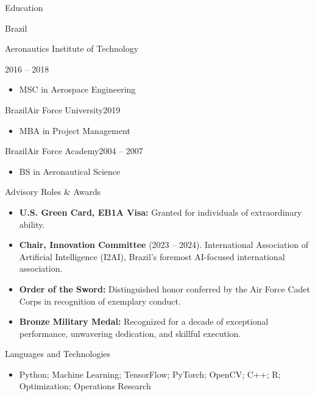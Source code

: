\documentclass[]{mcdowellcv}
\begin{document}
	\begin{cvsection}{Education}
		\begin{cvsubsection}{Brazil}{\protect\parbox{2.6in}{Aeronautics Institute of Technology}}{2016 -- 2018}
			\begin{itemize}
				\item MSC in Aerospace Engineering
			\end{itemize}
		\end{cvsubsection}
		
		\begin{cvsubsection}{Brazil}{Air Force University}{2019}
			\begin{itemize}
				\item MBA in Project Management
			\end{itemize}
		\end{cvsubsection}
		
		\begin{cvsubsection}{Brazil}{Air Force Academy}{2004 -- 2007}
			\begin{itemize}
				\item BS in Aeronautical Science
			\end{itemize}
		\end{cvsubsection}
	\end{cvsection}
	

		
	
	\begin{cvsection}{Advisory Roles \& Awards}
		\begin{cvsubsection}{}{}{}	
			\begin{itemize}
				\item \textbf{U.S. Green Card, EB1A Visa:} Granted for individuals of extraordinary ability.
				\item \textbf{Chair, Innovation Committee} (2023 -- 2024). International Association of Artificial Intelligence (I2AI), Brazil's foremost AI-focused international association.
				\item \textbf{Order of the Sword:} Distinguished honor conferred by the Air Force Cadet Corps in recognition of exemplary conduct.
				\item \textbf{Bronze Military Medal:} Recognized for a decade of exceptional performance, unwavering dedication, and skillful execution.
			\end{itemize}
		\end{cvsubsection}
	\end{cvsection}
	
	\begin{cvsection}{Languages and Technologies}
		\begin{cvsubsection}{}{}{}	
			\begin{itemize}
				\item Python; Machine Learning; TensorFlow; PyTorch; OpenCV; C++; R; Optimization; Operations Research
			\end{itemize}
		\end{cvsubsection}
	\end{cvsection}
	
\end{document}
